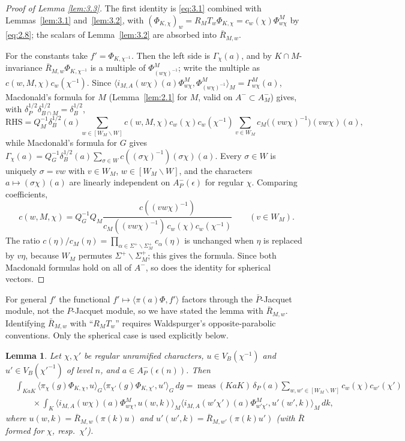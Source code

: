 \documentclass[12pt,letterpaper]{article}
\numberwithin{equation}{section}
\theoremstyle{plain}
\newtheorem{lemma}{Lemma}[section]
\theoremstyle{remark}
\theoremstyle{plain}
\theoremstyle{definition}
\theoremstyle{remark}
\theoremstyle{remark}
\newcommand{\ip}[1]{\langle #1\rangle}
\DeclareMathOperator{\meas}{meas}
\newcommand{\Wrep}[1]{[W_{#1}\backslash W]}
\begin{document}
\begin{proof}[Proof of Lemma \ref{lem:3.3}]
The first identity is \eqref{eq:3.1} combined with Lemmas~\ref{lem:3.1} and~\ref{lem:3.2}, with $(\Phi_{K,\chi})_w=R_MT_w\Phi_{K,\chi}=c_w(\chi)\Phi^M_{w\chi}$ by \eqref{eq:2.8}; the scalars of Lemma~\ref{lem:3.2} are absorbed into $\bar R_{M,w}$.

For the constants take $f'=\Phi_{K,\chi^{-1}}$. Then the left side is $\Gamma_\chi(a)$, and by $K\cap M$-invariance $\bar R_{M,w}\Phi_{K,\chi^{-1}}$ is a multiple of $\Phi^M_{(w\chi)^{-1}}$; write the multiple as $c(w,M,\chi)c_w(\chi^{-1})$. Since $\ip{i_{M,A}(w\chi)(a)\Phi^M_{w\chi},\Phi^M_{(w\chi)^{-1}}}_M=\Gamma^M_{w\chi}(a)$, Macdonald's formula for $M$ (Lemma~\ref{lem:2.1} for $M$, valid on $A^-\subset A^-_M$) gives, with $\delta_P^{1/2}\delta_{B\cap M}^{1/2}=\delta_B^{1/2}$,
\[
\text{RHS}=Q_M^{-1}\delta_B^{1/2}(a)\sum_{w\in\Wrep{M}}c(w,M,\chi)c_w(\chi)c_w(\chi^{-1})\sum_{v\in W_M}c_M\big((vw\chi)^{-1}\big)(vw\chi)(a),
\]
while Macdonald's formula for $G$ gives $\Gamma_\chi(a)=Q_G^{-1}\delta_B^{1/2}(a)\sum_{\sigma\in W}c((\sigma\chi)^{-1})(\sigma\chi)(a)$. Every $\sigma\in W$ is uniquely $\sigma=vw$ with $v\in W_M$, $w\in\Wrep{M}$, and the characters $a\mapsto(\sigma\chi)(a)$ are linearly independent on $A^-_P(\epsilon)$ for regular $\chi$. Comparing coefficients,
\[
c(w,M,\chi)=Q_G^{-1}Q_M\frac{c((vw\chi)^{-1})}{c_M((vw\chi)^{-1})\,c_w(\chi)c_w(\chi^{-1})}\qquad(v\in W_M).
\]
The ratio $c(\eta)/c_M(\eta)=\prod_{\alpha\in\Sigma^+\smallsetminus\Sigma^+_M}c_\alpha(\eta)$ is unchanged when $\eta$ is replaced by $v\eta$, because $W_M$ permutes $\Sigma^+\smallsetminus\Sigma^+_M$; this gives the formula. Since both Macdonald formulas hold on all of $A^-$, so does the identity for spherical vectors.
\end{proof}

\begin{rem26}\label{r:L33}
For general $f'$ the functional $f'\mapsto\ip{\pi(a)\Phi,f'}$ factors through the $\bar P$-Jacquet module, not the $P$-Jacquet module, so we have stated the lemma with $\bar R_{M,w}$. Identifying $\bar R_{M,w}$ with ``$R_MT_w$'' requires Waldspurger's opposite-parabolic conventions. Only the spherical case is used explicitly below.
\end{rem26}

\begin{lemma}\label{lem:3.4}
Let $\chi,\chi'$ be regular unramified characters, $u\in V_B(\chi^{-1})$ and $u'\in V_B(\chi'^{-1})$ of level $n$, and $a\in A^-_P(\epsilon(n))$. Then
\[
\begin{aligned}
&\int_{KaK}\ip{\pi_\chi(g)\Phi_{K,\chi},u}_G\ip{\pi_{\chi'}(g)\Phi_{K,\chi'},u'}_G\,dg
=\meas(KaK)\,\delta_P(a)\!\!\sum_{w,w'\in\Wrep{M}}\!\!c_w(\chi)c_{w'}(\chi')\\
&\qquad\times\int_K\ip{i_{M,A}(w\chi)(a)\Phi^M_{w\chi},u(w,k)}_M\ip{i_{M,A}(w'\chi')(a)\Phi^M_{w'\chi'},u'(w',k)}_M\,dk,
\end{aligned}
\]
where $u(w,k)=\bar R_{M,w}(\pi(k)u)$ and $u'(w',k)=\bar R_{M,w'}(\pi(k)u')$ (with $\bar R$ formed for $\chi$, resp.\ $\chi'$).
\end{lemma}
\end{document}
